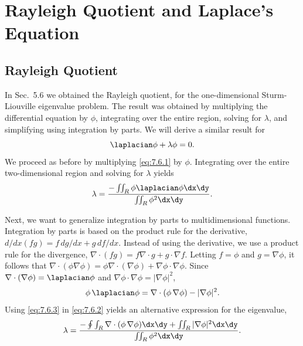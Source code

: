 \section{Rayleigh Quotient and Laplace's Equation}
\label{sec:7.6}

\subsection{Rayleigh Quotient}
\label{sec:7.6.1}

In Sec.~5.6 we obtained the Rayleigh quotient, for the one-dimensional Sturm-Liouville eigenvalue problem.  The result was obtained by multiplying the differential equation by $\phi$, integrating over the entire region, solving for $\lambda$, and simplifying using integration by parts.  We will derive a similar result for
\begin{equation}
\laplacian\phi + \lambda\phi = 0.
\label{eq:7.6.1}
\end{equation}
We proceed as before by multiplying \eqref{eq:7.6.1} by $\phi$.  Integrating over the entire two-dimensional region and solving for $\lambda$ yields
\begin{equation}
\lambda = \frac{-\iint_R \phi\laplacian\phi\dx\dy}{\iint_R \phi^2\dx\dy}.
\label{eq:7.6.2}
\end{equation}

Next, we want to generalize integration by parts to multidimensional functions.  Integration by parts is based on the product rule for the derivative, $d/dx(fg) = f\,dg/dx + g\,df/dx$.  Instead of using the derivative, we use a product rule for the divergence, $\nabla\cdot(fg) = f\nabla\cdot g + g\cdot\nabla f$.  Letting $f = \phi$ and $g = \nabla\phi$, it follows that $\nabla\cdot(\phi\nabla\phi) = \phi\nabla\cdot(\nabla\phi) + \nabla\phi\cdot\nabla\phi$.  Since $\nabla\cdot(\nabla\phi) = \laplacian\phi$ and $\nabla\phi\cdot\nabla\phi = |\nabla\phi|^2$,
\begin{equation}
\phi\,\laplacian\phi = \nabla\cdot(\phi\,\nabla\phi) - |\nabla\phi|^2.
\label{eq:7.6.3}
\end{equation}
Using \eqref{eq:7.6.3} in \eqref{eq:7.6.2} yields an alternative expression for the eigenvalue,
\begin{equation}
\lambda = \frac{-\oint\int_R \nabla\cdot(\phi\,\nabla\phi)\dx\dy + \iint_R |\nabla\phi|^2\dx\dy}{\iint_R \phi^2\dx\dy}.
\label{eq:7.6.4}
\end{equation}

